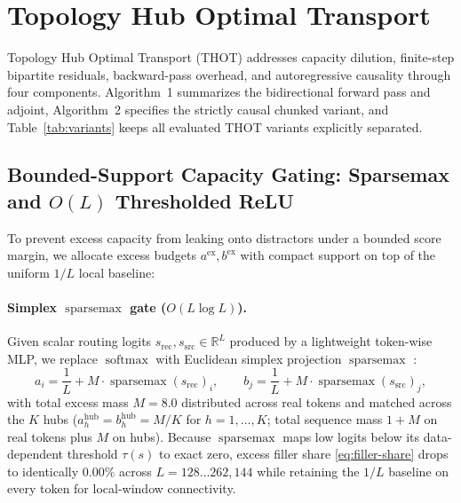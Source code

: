 \documentclass[11pt]{article}
\newcommand{\sparsemax}{\operatorname{sparsemax}}
\newcommand{\softmax}{\operatorname{softmax}}
\begin{document}
\section{Topology Hub Optimal Transport}
\label{sec:method}

Topology Hub Optimal Transport (THOT) addresses capacity dilution, finite-step bipartite residuals, backward-pass overhead, and autoregressive causality through four components. Algorithm~1 summarizes the bidirectional forward pass and adjoint, Algorithm~2 specifies the strictly causal chunked variant, and Table~\ref{tab:variants} keeps all evaluated THOT variants explicitly separated.

\subsection{Bounded-Support Capacity Gating: Sparsemax and \texorpdfstring{$O(L)$}{O(L)} Thresholded ReLU}
\label{sec:gates}

To prevent excess capacity from leaking onto distractors under a bounded score margin, we allocate excess budgets $a^{\text{ex}}, b^{\text{ex}}$ with compact support on top of the uniform $1/L$ local baseline:

\paragraph{Simplex $\sparsemax$ gate (\texorpdfstring{$O(L \log L)$}{O(L log L)}).}
Given scalar routing logits $s_{\text{rec}}, s_{\text{src}} \in \mathbb{R}^L$ produced by a lightweight token-wise MLP, we replace $\softmax$ with Euclidean simplex projection $\sparsemax$ \citep{martins2016softmax,correia2019adaptively}:
\begin{equation}
  a_i = \frac{1}{L} + M \cdot \sparsemax(s_{\text{rec}})_i, \qquad
  b_j = \frac{1}{L} + M \cdot \sparsemax(s_{\text{src}})_j,
  \label{eq:sparsemax-gate}
\end{equation}
with total excess mass $M=8.0$ distributed across real tokens and matched across the $K$ hubs ($a^{\text{hub}}_h = b^{\text{hub}}_h = M/K$ for $h=1,\dots,K$; total sequence mass $1 + M$ on real tokens plus $M$ on hubs). Because $\sparsemax$ maps low logits below its data-dependent threshold $\tau(s)$ to exact zero, excess filler share \eqref{eq:filler-share} drops to identically $0.00\%$ across $L=128\dots 262{,}144$ while retaining the $1/L$ baseline on every token for local-window connectivity.
\end{document}
